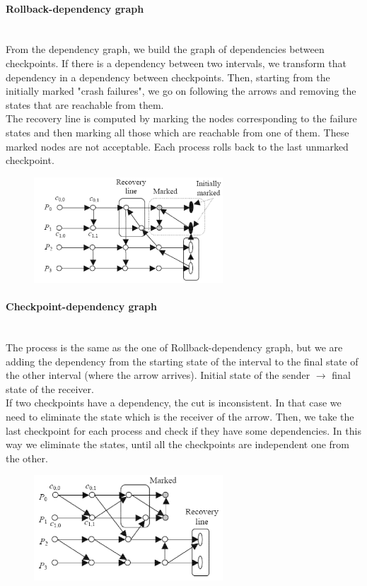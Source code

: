 \documentclass[10pt,a4paper]{article}
\newcommand{\myparagraph}[1]{\paragraph{#1}\mbox{}\\[0.05in]}
\begin{document}
\myparagraph{Rollback-dependency graph}
From the dependency graph, we build the graph of dependencies between checkpoints. If there is a dependency between two intervals, we transform that dependency in a dependency between checkpoints. Then, starting from the initially marked "crash failures", we go on following the arrows and removing the states that are reachable from them. \\ The recovery line is computed by marking the nodes corresponding to the failure states and then marking all those which are reachable from one of them. These marked nodes are not acceptable. Each process rolls back to the last unmarked checkpoint.
\begin{figure}[h!]
\hfill \includegraphics[width=200pt]{images/rollback.png}\hspace*{\fill}
  \label{fig:rollback}
\end{figure}
\myparagraph{Checkpoint-dependency graph}
The process is the same as the one of Rollback-dependency graph, but we are adding the dependency from the starting state of the interval to the final state of the other interval (where the arrow arrives). Initial state of the sender $\rightarrow$ final state of the receiver. \\ If two checkpoints have a dependency, the cut is inconsistent. In that case we need to eliminate the state which is the receiver of the arrow. Then, we take the last checkpoint for each process and check if they have some dependencies. In this way we eliminate the states, until all the checkpoints are independent one from the other.
\begin{figure}[h!]
\hfill \includegraphics[width=200pt]{images/checkpoint.png}\hspace*{\fill}
  \label{fig:checkpoint}
\end{figure} \pagebreak \\
\end{document}
